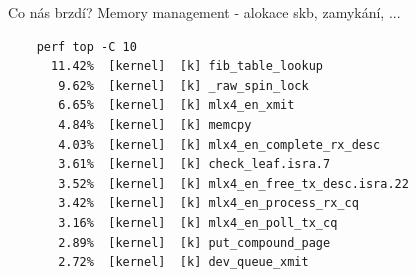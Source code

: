 \documentclass{beamer}
\begin{document}
\begin{frame}[fragile]{Co nás brzdí?}
	Memory management - alokace skb, zamykání, ...
	\begin{lstlisting}
	perf top -C 10
	  11.42%  [kernel]  [k] fib_table_lookup
	   9.62%  [kernel]  [k] _raw_spin_lock
	   6.65%  [kernel]  [k] mlx4_en_xmit
	   4.84%  [kernel]  [k] memcpy
	   4.03%  [kernel]  [k] mlx4_en_complete_rx_desc
	   3.61%  [kernel]  [k] check_leaf.isra.7
	   3.52%  [kernel]  [k] mlx4_en_free_tx_desc.isra.22
	   3.42%  [kernel]  [k] mlx4_en_process_rx_cq
	   3.16%  [kernel]  [k] mlx4_en_poll_tx_cq
	   2.89%  [kernel]  [k] put_compound_page
	   2.72%  [kernel]  [k] dev_queue_xmit
	\end{lstlisting}
\end{frame}
\end{document}
